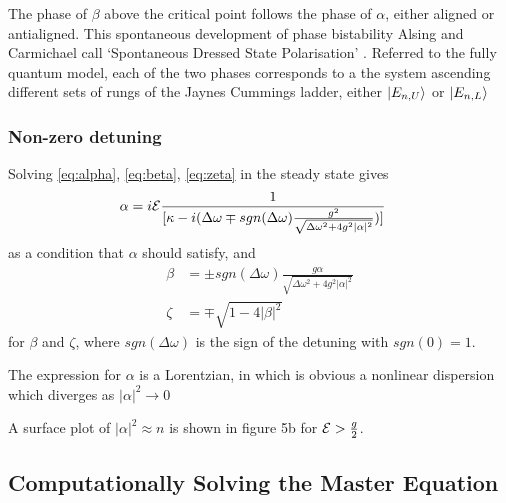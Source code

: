 The phase of $\beta$ above the critical point follows the phase of $\alpha$, either aligned or antialigned. This spontaneous development of phase bistability Alsing and Carmichael call `Spontaneous Dressed State Polarisation' \autocite{Alsing1999}. Referred to the fully quantum model, each of the two phases corresponds to a the system ascending different sets of rungs of the Jaynes Cummings ladder, either $| E_{n, U} \rangle$ or $| E_{n, L} \rangle$
\subsubsection{Non-zero detuning}
Solving \cref{eq:alpha}, \cref{eq:beta}, \cref{eq:zeta} in the steady state gives
\begin{align}
  \alpha& = i \mathcal{E}\frac{1}{[\kappa-i(\Delta \omega \mp sgn(\Delta \omega) \frac{g^2}{\sqrt{\Delta \omega^2 +4g^2 |\alpha|^2}})]}
\end{align}
as a condition that $\alpha$ should satisfy, and
\begin{align}
  \beta& = \pm sgn(\Delta \omega) \frac{g \alpha}{\sqrt{\Delta \omega^2 + 4 g^2 |\alpha|^2}}\\
  \zeta& = \mp \sqrt{1-4|\beta|^2}
\end{align}
for $\beta$ and $\zeta$, where $sgn(\Delta \omega)$ is the sign of the detuning with $sgn(0) = 1$.

The expression for $\alpha$ is a Lorentzian, in which is obvious a nonlinear dispersion which diverges as $|\alpha|^2 \rightarrow 0$

A surface plot of $|\alpha|^2 \approx n$ is shown in figure 5b for $\mathcal{E}>\frac{g}{2}$.
\subsection{Computationally Solving the Master Equation}

